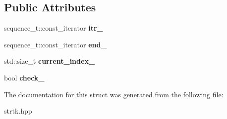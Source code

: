 \subsection*{Public Attributes}
\begin{DoxyCompactItemize}
\item 
\hypertarget{structstrtk_1_1details_1_1index__remover__impl_af503307f08fab2eec411485f5646e367}{sequence\-\_\-t\-::const\-\_\-iterator {\bfseries itr\-\_\-}}\label{structstrtk_1_1details_1_1index__remover__impl_af503307f08fab2eec411485f5646e367}

\item 
\hypertarget{structstrtk_1_1details_1_1index__remover__impl_ae20154a16b4b52e682c24a19e257c8b6}{sequence\-\_\-t\-::const\-\_\-iterator {\bfseries end\-\_\-}}\label{structstrtk_1_1details_1_1index__remover__impl_ae20154a16b4b52e682c24a19e257c8b6}

\item 
\hypertarget{structstrtk_1_1details_1_1index__remover__impl_a87d808afad703486a92984a0c4f3078d}{std\-::size\-\_\-t {\bfseries current\-\_\-index\-\_\-}}\label{structstrtk_1_1details_1_1index__remover__impl_a87d808afad703486a92984a0c4f3078d}

\item 
\hypertarget{structstrtk_1_1details_1_1index__remover__impl_a210debd9dd385be69f6630b3167ee6f2}{bool {\bfseries check\-\_\-}}\label{structstrtk_1_1details_1_1index__remover__impl_a210debd9dd385be69f6630b3167ee6f2}

\end{DoxyCompactItemize}


The documentation for this struct was generated from the following file\-:\begin{DoxyCompactItemize}
\item 
strtk.\-hpp\end{DoxyCompactItemize}
